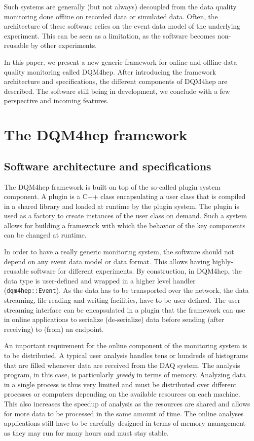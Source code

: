 \documentclass{webofc}
\begin{document}
Such systems are generally (but not always) decoupled from the data quality monitoring done offline on recorded data or simulated data.
Often, the architecture of these software relies on the event data model of the underlying experiment. This can be seen as a limitation, as the software becomes non-reusable by other experiments.

In this paper, we present a new generic framework for online and offline data quality monitoring called DQM4hep.
After introducing the framework architecture and specifications, the different components of DQM4hep are described.
The software still being in development, we conclude with a few perspective and incoming features.

\section{The DQM4hep framework}
\label{sec:framework}

\subsection{Software architecture and specifications}
\label{subsec:arch}

The DQM4hep framework is built on top of the so-called plugin system component.
A plugin is a C++ class encapsulating a user class that is compiled in a shared library and loaded at runtime by the plugin system.
The plugin is used as a factory to create instances of the user class on demand.
Such a system allows for building a framework with which the behavior of the key components can be changed at runtime.

In order to have a really generic monitoring system, the software should not depend on any event data model or data format.
This allows having highly-reusable software for different experiments.
By construction, in DQM4hep, the data type is user-defined and wrapped in a higher level handler (\texttt{dqm4hep::Event}).
As the data has to be transported over the network, the data streaming, file reading and writing facilities, have to be user-defined.
The user-streaming interface can be encapsulated in a plugin that the framework can use in online applications to serialize (de-serialize) data before sending (after receiving) to (from) an endpoint.

An important requirement for the online component of the monitoring system is to be distributed.
A typical user analysis handles tens or hundreds of histograms that are filled whenever data are received from the DAQ system.
The analysis program, in this case, is particularly \textit{greedy} in terms of memory.
Analyzing data in a single process is thus very limited and must be distributed over different processes or computers depending on the available resources on each machine.
This also increases the speedup of analysis as the resources are shared and allows for more data to be processed in the same amount of time.
The online analyses applications still have to be carefully designed in terms of memory management as they may run for many hours and must stay stable.
\end{document}
